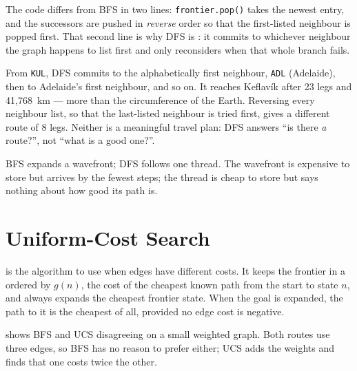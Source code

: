 The code differs from BFS in two lines: \texttt{frontier.pop()} takes the newest entry, and the successors are pushed in \emph{reverse} order so that the first-listed neighbour is popped first. That second line is why DFS is : it commits to whichever neighbour the graph happens to list first and only reconsiders when that whole branch fails.

\begin{workedexample}
From \texttt{KUL}, DFS commits to the alphabetically first neighbour, \texttt{ADL} (Adelaide), then to Adelaide's first neighbour, and so on. It reaches Keflav\'ik after 23 legs and 41,768~km --- more than the circumference of the Earth. Reversing every neighbour list, so that the last-listed neighbour is tried first, gives a different route of 8 legs. Neither is a meaningful travel plan: DFS answers ``is there \emph{a} route?'', not ``what is a good one?''.
\end{workedexample}

\begin{intuition}
BFS expands a wavefront; DFS follows one thread. The wavefront is expensive to store but arrives by the fewest steps; the thread is cheap to store but says nothing about how good its path is.
\end{intuition}

\section{Uniform-Cost Search}

 is the algorithm to use when edges have different costs. It keeps the frontier in a  ordered by $g(n)$, the cost of the cheapest known path from the start to state $n$, and always expands the cheapest frontier state. When the goal is expanded, the path to it is the cheapest of all, provided no edge cost is negative.

 shows BFS and UCS disagreeing on a small weighted graph. Both routes use three edges, so BFS has no reason to prefer either; UCS adds the weights and finds that one costs twice the other.

